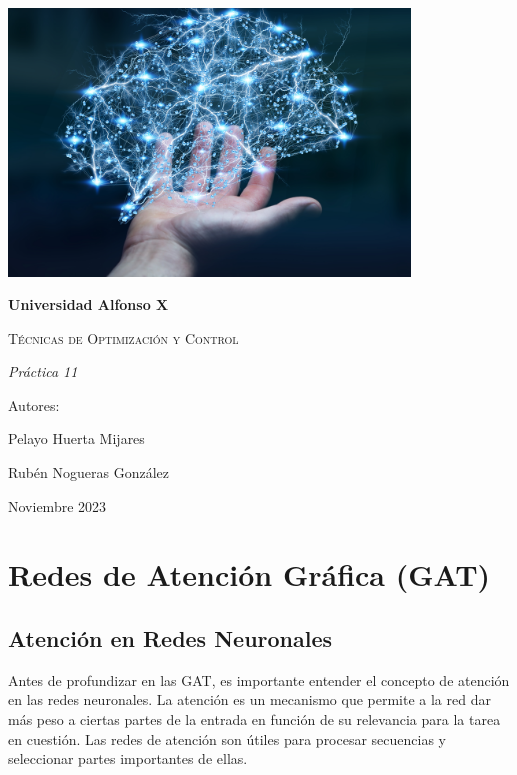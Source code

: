 \documentclass{article}
\begin{document}
    \begin{titlepage}
    \centering
    {\includegraphics[width=0.8\textwidth]{portada.png}\par}
    \vspace{1cm}
    {\bfseries\LARGE Universidad Alfonso X \par}
    \vspace{3cm}
    {\scshape\Huge Técnicas de Optimización y Control \par}
    \vspace{2cm}
    {\itshape\Large Práctica 11 \par}
    \vspace{1cm}
    {\Large Autores: \par}
    {\Large Pelayo Huerta Mijares \par}
    {\Large Rubén Nogueras González \par}
    \vfill
    {\Large Noviembre 2023 \par}
    \end{titlepage}


\section{Redes de Atención Gráfica (GAT)}

\subsection{Atención en Redes Neuronales}

Antes de profundizar en las GAT, es importante entender el concepto de atención en las redes neuronales. La atención es un mecanismo que permite a la red dar más peso a ciertas partes de la entrada en función de su relevancia para la tarea en cuestión. Las redes de atención son útiles para procesar secuencias y seleccionar partes importantes de ellas.
\end{document}
